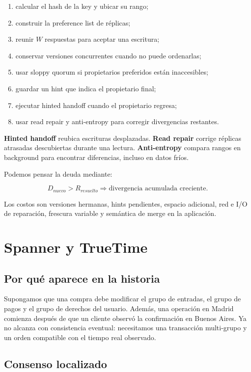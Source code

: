 \documentclass[variant=apuntes,cover=institutional,mode=screen]{ua-engineering-v6-article}
\begin{document}
\begin{enumerate}
\item calcular el hash de la key y ubicar su rango;
\item construir la preference list de réplicas;
\item reunir \(W\) respuestas para aceptar una escritura;
\item conservar versiones concurrentes cuando no puede ordenarlas;
\item usar sloppy quorum si propietarios preferidos están inaccesibles;
\item guardar un hint que indica el propietario final;
\item ejecutar hinted handoff cuando el propietario regresa;
\item usar read repair y anti-entropy para corregir divergencias restantes.
\end{enumerate}

\textbf{Hinted handoff} reubica escrituras desplazadas. \textbf{Read repair} corrige réplicas atrasadas descubiertas durante una lectura. \textbf{Anti-entropy} compara rangos en background para encontrar diferencias, incluso en datos fríos.

Podemos pensar la deuda mediante:

\[
D_{nuevo}>R_{resuelto}\Longrightarrow\text{divergencia acumulada creciente}.
\]

Los costos son versiones hermanas, hints pendientes, espacio adicional, red e I/O de reparación, frescura variable y semántica de merge en la aplicación.

\section{Spanner y TrueTime}

\subsection{Por qué aparece en la historia}

Supongamos que una compra debe modificar el grupo de entradas, el grupo de pagos y el grupo de derechos del usuario. Además, una operación en Madrid comienza después de que un cliente observó la confirmación en Buenos Aires. Ya no alcanza con consistencia eventual: necesitamos una transacción multi-grupo y un orden compatible con el tiempo real observado.

\subsection{Consenso localizado}
\end{document}
